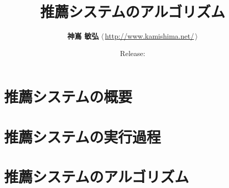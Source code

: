 \documentclass[11pt,a4paper,papersize,oneside]{jsbook}
\title{\Huge\sffamily\bfseries 推薦システムのアルゴリズム}
\author{\Large\textbf{神嶌 敏弘} \quad$\langle\,$\url{http://www.kamishima.net/}$\,\rangle$}
\date{Release: }
\begin{document}
\frontmatter

\maketitle

\onehalfspacing




\tableofcontents

\mainmatter


\part{推薦システムの概要}
\label{part:overview}




\part{推薦システムの実行過程}
\label{part:process}





\part{推薦システムのアルゴリズム}
\label{part:algorithm}








\backmatter
\singlespacing





\pagestyle{empty}
\printindex
\end{document}
